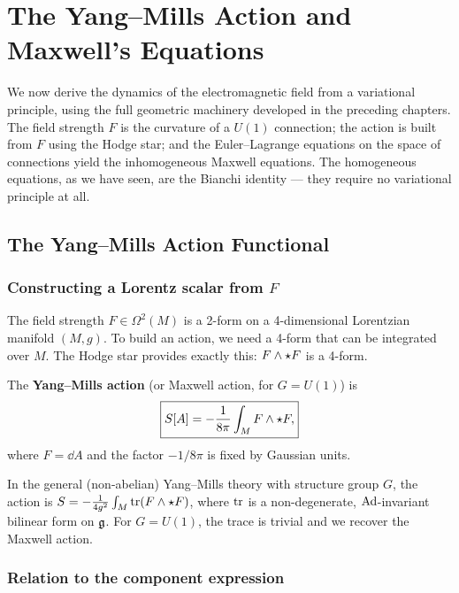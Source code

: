\chapter{The Yang--Mills Action and Maxwell's Equations}

We now derive the dynamics of the electromagnetic field from a variational principle, using the full geometric machinery developed in the preceding chapters. The field strength $F$ is the curvature of a $U(1)$ connection; the action is built from $F$ using the Hodge star; and the Euler--Lagrange equations on the space of connections yield the inhomogeneous Maxwell equations. The homogeneous equations, as we have seen, are the Bianchi identity --- they require no variational principle at all.

\section{The Yang--Mills Action Functional}

\subsection{Constructing a Lorentz scalar from $F$}

The field strength $F \in \Omega^2(M)$ is a 2-form on a 4-dimensional Lorentzian manifold $(M, g)$. To build an action, we need a 4-form that can be integrated over $M$. The Hodge star provides exactly this: $F \wedge \star F$ is a 4-form.

\begin{definition}
The \textbf{Yang--Mills action} (or Maxwell action, for $G = U(1)$) is
\begin{equation}
\boxed{S[A] = -\frac{1}{8\pi}\int_M F \wedge \star F,}
\end{equation}
where $F = \dd A$ and the factor $-1/8\pi$ is fixed by Gaussian units.
\end{definition}

\begin{remark}
In the general (non-abelian) Yang--Mills theory with structure group $G$, the action is $S = -\frac{1}{4g^2}\int_M \operatorname{tr}(F \wedge \star F)$, where $\operatorname{tr}$ is a non-degenerate, $\mathrm{Ad}$-invariant bilinear form on $\mathfrak{g}$. For $G = U(1)$, the trace is trivial and we recover the Maxwell action.
\end{remark}

\subsection{Relation to the component expression}


